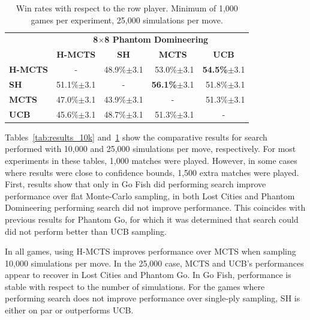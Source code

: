 \documentclass[a4paper]{llncs}
\begin{document}
\begin{table}[ht]
\begin{tabular}{@{}lrrrr@{}}
\toprule
& \multicolumn{4}{c}{\textbf{8$\times$8 Phantom Domineering}}       \\
& \multicolumn{1}{c}{\textbf{H-MCTS}} & \multicolumn{1}{c}{\textbf{SH}} & \multicolumn{1}{c}{\textbf{MCTS}} & \multicolumn{1}{c}{\textbf{UCB}} \\ [1mm] \cmidrule(l){2-5} 
\textbf{H-MCTS} & \multicolumn{1}{c}{-}		& 48.9\%$\pm$3.1			& 53.0\%$\pm$3.1 			& \textbf{54.5\%}$\pm$3.1 		\\[.5mm] 
\textbf{SH}     & 51.1\%$\pm$3.1			& \multicolumn{1}{c}{-}		& \textbf{56.1\%}$\pm$3.1	& 51.8\%$\pm$3.1		 		\\[.5mm] 
\textbf{MCTS}   & 47.0\%$\pm$3.1			& 43.9\%$\pm$3.1			& \multicolumn{1}{c}{-} 	& 51.3\%$\pm$3.1  				\\[.5mm] 
\textbf{UCB}	& 45.6\%$\pm$3.1			& 48.7\%$\pm$3.1			& 51.3\%$\pm$3.1			& \multicolumn{1}{c}{-} 		\\[.5mm] \bottomrule
\end{tabular}

\vspace{2mm}
{\caption{Win rates with respect to the row player. Minimum of 1,000 games per experiment, 25,000 simulations per move.} \label{tab:results_25k}}
\end{table}

Tables~\ref{tab:results_10k} and~\ref{tab:results_25k} show the comparative results for search performed with 10,000 and 25,000 simulations per move, respectively. For most experiments in these tables, 1,000 matches were played. However, in some cases where results were close to confidence bounds, 1,500 extra matches were played. First, results show that only in Go Fish did performing search improve performance over flat Monte-Carlo sampling, in both Lost Cities and Phantom Domineering performing search did not improve performance. This coincides with previous results for Phantom Go, for which it was determined that search could did not perform better than UCB sampling. 

In all games, using H-MCTS improves performance over MCTS when sampling 10,000 simulations per move. In the 25,000 case, MCTS and UCB's performances appear to recover in Lost Cities and Phantom Go. In Go Fish, performance is stable with respect to the number of simulations. For the games where performing search does not improve performance over single-ply sampling, SH is either on par or outperforms UCB.
\end{document}
